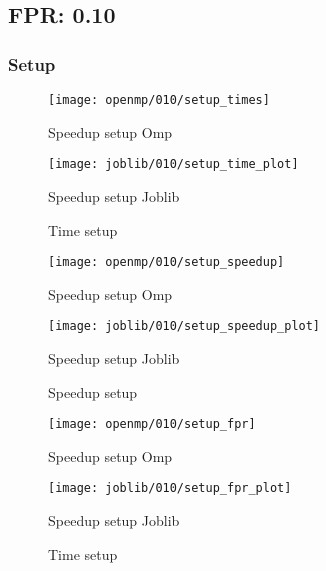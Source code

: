 \subsection{FPR: 0.10}\label{subsec:fpr-010}
\subsubsection{Setup}\label{subsubsec:fpr-010-setup}
\begin{figure}[H]
    \centering
    \texttt{[image: openmp/010/setup\_times]}
        \caption{Speedup setup Omp}\label{fig:010-setup_time_omp}
    \endminipage\hfill
    \texttt{[image: joblib/010/setup\_time\_plot]}
        \caption{Speedup setup Joblib}\label{fig:010setup_time_joblib}
    \endminipage\hfill
    \caption{Time setup}
\end{figure}
\begin{figure}[H]
    \centering
    \texttt{[image: openmp/010/setup\_speedup]}
        \caption{Speedup setup Omp}\label{fig:010-setup_speedup_omp}
    \endminipage\hfill
    \texttt{[image: joblib/010/setup\_speedup\_plot]}
        \caption{Speedup setup Joblib}\label{fig:010-setup_speedup_joblib}
    \endminipage\hfill
    \caption{Speedup setup}
\end{figure}
\begin{figure}[H]
    \centering
    \texttt{[image: openmp/010/setup\_fpr]}
        \caption{Speedup setup Omp}\label{fig:010-setup_fpr_omp}
    \endminipage\hfill
    \texttt{[image: joblib/010/setup\_fpr\_plot]}
        \caption{Speedup setup Joblib}\label{fig:010-setup_fpr_joblib}
    \endminipage\hfill
    \caption{Time setup}
\end{figure}

